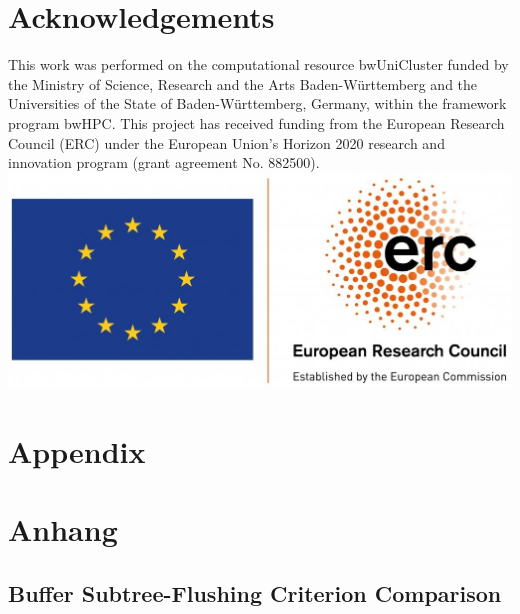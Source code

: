 
\chapter{Acknowledgements}
This work was performed on the computational resource bwUniCluster funded by the Ministry of Science, Research and the Arts Baden-Württemberg and the Universities of the State of Baden-Württemberg, Germany, within the framework program bwHPC.
This project has received funding from the European Research Council (ERC) under the European Union’s Horizon 2020 research and innovation program (grant agreement No. 882500).
\\
\vspace{4cm}
\includegraphics[scale=0.1]{logos/erc.png}

\printglossary[type=\acronymtype]
\printglossary

{\chapter{Appendix}}    %
{\chapter{Anhang}}      %
\label{chap:appendix}

\section{Buffer Subtree-Flushing Criterion Comparison}

